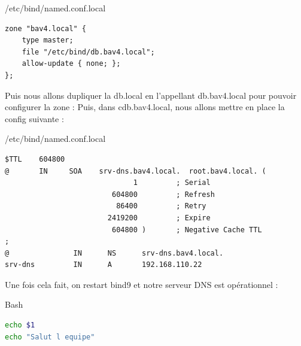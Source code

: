 \documentclass{article}
\begin{document}
\begin{configbox}{/etc/bind/named.conf.local}
\begin{lstlisting}
zone "bav4.local" {
    type master;
    file "/etc/bind/db.bav4.local";
    allow-update { none; };
};
\end{lstlisting}
\end{configbox}
Puis nous allons dupliquer la db.local en l’appellant db.bav4.local pour pouvoir configurer la zone : 
Puis, dans cdb.bav4.local, nous allons mettre en place la config suivante :

\begin{configbox}{/etc/bind/named.conf.local}
\begin{lstlisting}
$TTL    604800
@       IN     SOA    srv-dns.bav4.local.  root.bav4.local. (
                              1         ; Serial
                         604800         ; Refresh
                          86400         ; Retry
                        2419200         ; Expire
                         604800 )       ; Negative Cache TTL
;
@               IN      NS      srv-dns.bav4.local.
srv-dns         IN      A       192.168.110.22
\end{lstlisting}
\end{configbox}
Une fois cela fait, on restart bind9 et notre serveur DNS est opérationnel :

\begin{codebox}{Bash}
\begin{lstlisting}[language=Bash]
echo $1
echo "Salut l equipe"

\end{lstlisting}
\end{codebox}
\end{document}
